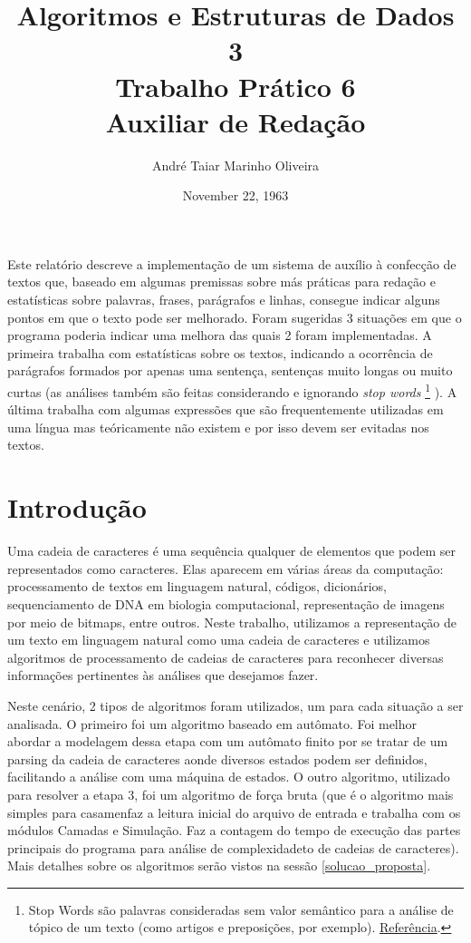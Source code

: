 \documentclass[12pt]{article}
\title{Algoritmos e Estruturas de Dados 3 \\ Trabalho Prático 6 \\
\huge{Auxiliar de Redação}}
\date{November 22, 1963}
\author{André Taiar Marinho Oliveira}
\begin{document}
\maketitle

\begin{resumo}
\label{resumo}
Este relatório descreve a implementação de um sistema de auxílio à confecção de textos que, baseado em algumas premissas sobre más práticas para redação e estatísticas sobre palavras, frases, parágrafos e linhas, consegue indicar alguns pontos em que o texto pode ser melhorado. Foram sugeridas 3 situações em que o programa poderia indicar uma melhora das quais 2 foram implementadas. A primeira trabalha com estatísticas sobre os textos, indicando a ocorrência de parágrafos formados por apenas uma sentença, sentenças muito longas ou muito curtas (as análises também são feitas considerando e ignorando \textit{stop words} \footnote{Stop Words são palavras consideradas sem valor semântico para a análise de tópico de um texto (como artigos e preposições, por exemplo). \href{http://searchenginewatch.com/2156061}{Referência}.} ). A última trabalha com algumas expressões que são frequentemente utilizadas em uma língua mas teóricamente não existem e por isso devem ser evitadas nos textos.
\end{resumo}

\section{Introdução}
\label{introducao}

Uma cadeia de caracteres é uma sequência qualquer de elementos que podem ser representados como caracteres. Elas aparecem em várias áreas da computação: processamento de textos em linguagem natural, códigos, dicionários, sequenciamento de DNA em biologia computacional, representação de imagens por meio de bitmaps, entre outros. Neste trabalho, utilizamos a representação de um texto em linguagem natural como uma cadeia de caracteres e utilizamos algoritmos de processamento de cadeias de caracteres para reconhecer diversas informações pertinentes às análises que desejamos fazer.

Neste cenário, 2 tipos de algoritmos foram utilizados, um para cada situação a ser analisada. O primeiro foi um algoritmo baseado em autômato. Foi melhor abordar a modelagem dessa etapa com um autômato finito por se tratar de um parsing da cadeia de caracteres aonde diversos estados podem ser definidos, facilitando a análise com uma máquina de estados. O outro algoritmo, utilizado para resolver a etapa 3, foi um algoritmo de força bruta (que é o algoritmo mais simples para casamenfaz a leitura inicial do arquivo de entrada e trabalha com os módulos Camadas e Simulação. Faz a contagem do tempo de execução das partes principais do programa para análise de complexidadeto de cadeias de caracteres). Mais detalhes sobre os algoritmos serão vistos na sessão \ref{solucao_proposta}.
\end{document}
